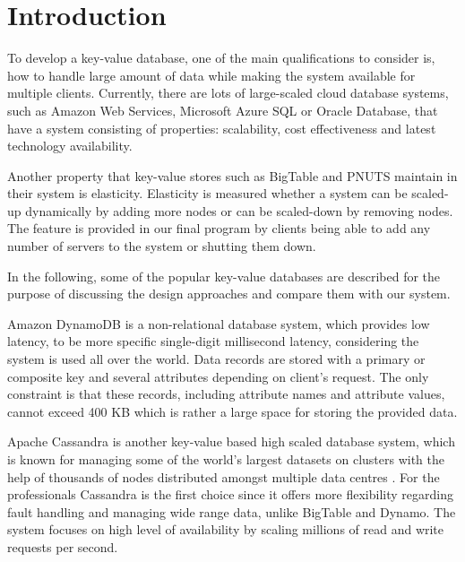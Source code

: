 \section{Introduction}
\label{sec:introduction}

To develop a key-value database, one of the main qualifications to consider is, how to handle large amount of data while making the system available for multiple clients. Currently, there are lots of large-scaled cloud database systems, such as Amazon Web Services, Microsoft Azure SQL or Oracle Database, that have a system consisting of properties: scalability, cost effectiveness and latest technology availability. 

Another property that key-value stores such as BigTable and PNUTS maintain in their system is elasticity. Elasticity is measured whether a system can be scaled-up dynamically by adding more nodes or can be scaled-down by removing nodes\cite{agrawal2011database}. The feature is provided in our final program by clients being able to add any number of servers to the system or shutting them down.

In the following, some of the popular key-value databases are described for the purpose of discussing the design approaches and compare them with our system.

Amazon DynamoDB is a non-relational database system, which provides low latency, to be more specific single-digit millisecond latency\cite{amazon}, considering the system is used all over the world. Data records are stored with a primary or composite key and several attributes depending on client's request\cite{kalid2017big}. The only constraint is that these records, including attribute names and attribute values, cannot exceed 400 KB\cite{amazon} which is rather a large space for storing the provided data.

Apache Cassandra is another key-value based high scaled\cite{abadi2012consistency} database system, which is known for managing some of the world's largest datasets on clusters with the help of thousands of nodes distributed amongst multiple data centres \cite{chebotko2015big}. For the professionals Cassandra is the first choice since it offers more flexibility regarding fault handling and managing wide range data, unlike BigTable and Dynamo\cite{kalid2017big}. The system focuses on high level of availability by scaling millions of read and write requests per second\cite{chebotko2015big}.

